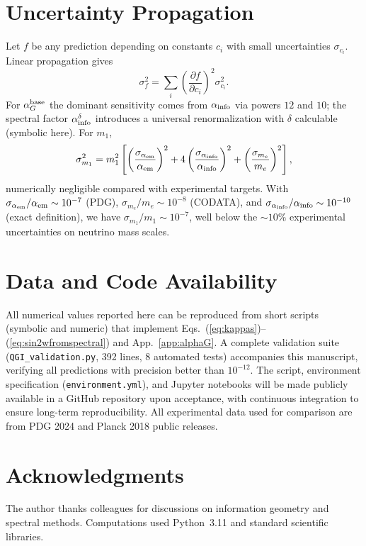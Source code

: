 \documentclass{article}
\numberwithin{equation}{section}
\theoremstyle{plain}
\theoremstyle{definition}
\theoremstyle{remark}
\begin{document}
\section{Uncertainty Propagation}
\label{app:uncertainty}

Let $f$ be any prediction depending on constants $c_i$ with small uncertainties $\sigma_{c_i}$. Linear propagation gives
\[
\sigma_f^2=\sum_i \left(\frac{\partial f}{\partial c_i}\right)^2\sigma_{c_i}^2.
\]
For $\alpha_G^{\rm base}$ the dominant sensitivity comes from $\alpha_{\rm info}$ via powers $12$ and $10$; the spectral factor $\alpha_{\rm info}^\delta$ introduces a universal renormalization with $\delta$ calculable (symbolic here). For $m_1$,
\[
\sigma_{m_1}^2 = m_1^2\left[ \left(\frac{\sigma_{\alpha_{\rm em}}}{\alpha_{\rm em}}\right)^2 + 4\left(\frac{\sigma_{\alpha_{\rm info}}}{\alpha_{\rm info}}\right)^2 + \left(\frac{\sigma_{m_e}}{m_e}\right)^2\right],
\]
numerically negligible compared with experimental targets. With $\sigma_{\alpha_{\rm em}}/\alpha_{\rm em}\sim 10^{-7}$ (PDG), $\sigma_{m_e}/m_e\sim 10^{-8}$ (CODATA), and $\sigma_{\alpha_{\rm info}}/\alpha_{\rm info}\sim 10^{-10}$ (exact definition), we have $\sigma_{m_1}/m_1\sim 10^{-7}$, well below the $\sim 10\%$ experimental uncertainties on neutrino mass scales.


\section*{Data and Code Availability}
All numerical values reported here can be reproduced from short scripts (symbolic and numeric) that implement Eqs.~(\ref{eq:kappas})--(\ref{eq:sin2wfromspectral}) and App.~\ref{app:alphaG}. A complete validation suite (\texttt{QGI\_validation.py}, 392 lines, 8 automated tests) accompanies this manuscript, verifying all predictions with precision better than $10^{-12}$. The script, environment specification (\texttt{environment.yml}), and Jupyter notebooks will be made publicly available in a GitHub repository upon acceptance, with continuous integration to ensure long-term reproducibility. All experimental data used for comparison are from PDG 2024 and Planck 2018 public releases.

\section*{Acknowledgments}
The author thanks colleagues for discussions on information geometry and spectral methods. Computations used Python~3.11 and standard scientific libraries.
\end{document}
